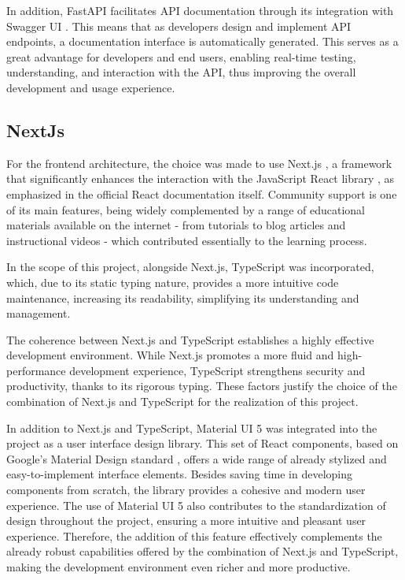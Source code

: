 In addition, FastAPI facilitates API documentation through its integration with Swagger UI \cite{swaggerui2023}. This means that as developers design and implement API endpoints, a documentation interface is automatically generated. This serves as a great advantage for developers and end users, enabling real-time testing, understanding, and interaction with the API, thus improving the overall development and usage experience.

\subsection{NextJs}
For the frontend architecture, the choice was made to use Next.js \cite{nextjsDocs}, a framework that significantly enhances the interaction with the JavaScript React library \cite{reactDocs}, as emphasized in the official React documentation itself. Community support is one of its main features, being widely complemented by a range of educational materials available on the internet - from tutorials to blog articles and instructional videos - which contributed essentially to the learning process.

In the scope of this project, alongside Next.js, TypeScript \cite{typescriptLang} was incorporated, which, due to its static typing nature, provides a more intuitive code maintenance, increasing its readability, simplifying its understanding and management.

The coherence between Next.js and TypeScript establishes a highly effective development environment. While Next.js promotes a more fluid and high-performance development experience, TypeScript strengthens security and productivity, thanks to its rigorous typing. These factors justify the choice of the combination of Next.js and TypeScript for the realization of this project.

In addition to Next.js and TypeScript, Material UI 5 \cite{muiDocs} was integrated into the project as a user interface design library. This set of React components, based on Google's Material Design standard \cite{m3Docs}, offers a wide range of already stylized and easy-to-implement interface elements. Besides saving time in developing components from scratch, the library provides a cohesive and modern user experience. The use of Material UI 5 also contributes to the standardization of design throughout the project, ensuring a more intuitive and pleasant user experience. Therefore, the addition of this feature effectively complements the already robust capabilities offered by the combination of Next.js and TypeScript, making the development environment even richer and more productive.

